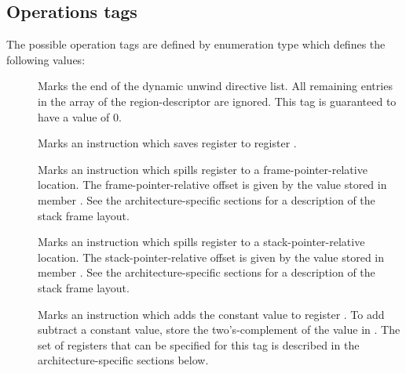 \documentclass{article}
\begin{document}
\subsection{Operations tags}

The possible operation tags are defined by enumeration type
 which defines the following
values:
\begin{description}

\item[] Marks the end of the dynamic unwind
  directive list.  All remaining entries in the  array of the
  region-descriptor are ignored.  This tag is guaranteed to have a
  value of 0.

\item[] Marks an instruction which saves
  register  to register .

\item[] Marks an instruction which
  spills register  to a frame-pointer-relative location.  The
  frame-pointer-relative offset is given by the value stored in member
  .  See the architecture-specific sections for a description
  of the stack frame layout.

\item[] Marks an instruction which
  spills register  to a stack-pointer-relative location.  The
  stack-pointer-relative offset is given by the value stored in member
  .  See the architecture-specific sections for a description
  of the stack frame layout.

\item[] Marks an instruction which adds
  the constant value  to register .  To add subtract
  a constant value, store the two's-complement of the value in
  .  The set of registers that can be specified for this tag
  is described in the architecture-specific sections below.

\item[]

\item[]

\item[]

\item[]

\end{description}
\end{document}
